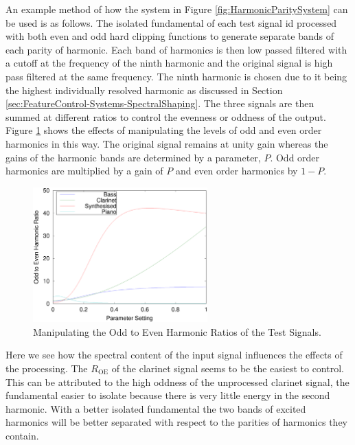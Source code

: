 			An example method of how the system in Figure \ref{fig:HarmonicParitySystem} can be used is as
			follows. The isolated fundamental of each test signal id processed with both even and odd hard
			clipping functions to generate separate bands of each parity of harmonic. Each band of harmonics is
			then low passed filtered with a cutoff at the frequency of the ninth harmonic and the original
			signal is high pass filtered at the same frequency. The ninth harmonic is chosen due to it being
			the highest individually resolved harmonic as discussed in Section
			\ref{sec:FeatureControl-Systems-SpectralShaping}. The three signals are then summed at different
			ratios to control the evenness or oddness of the output. Figure \ref{fig:MoveParities} shows the
			effects of manipulating the levels of odd and even order harmonics in this way. The original signal
			remains at unity gain whereas the gains of the harmonic bands are determined by a parameter, $P$.
			Odd order harmonics are multiplied by a gain of $P$ and even order harmonics by $1 - P$.

			\begin{figure}[h!]
				\centering
				\includegraphics[width=0.6\textwidth]{chapter6/Images/MoveParities.eps}
				\caption{Manipulating the Odd to Even Harmonic Ratios of the Test Signals.}
				\label{fig:MoveParities}
			\end{figure}

			Here we see how the spectral content of the input signal influences the effects of the processing.
			The $R_{\textrm{OE}}$ of the clarinet signal seems to be the easiest to control. This can be
			attributed to the high oddness of the unprocessed clarinet signal, the fundamental easier to
			isolate because there is very little energy in the second harmonic. With a better isolated
			fundamental the two bands of excited harmonics will be better separated with respect to the
			parities of harmonics they contain.

